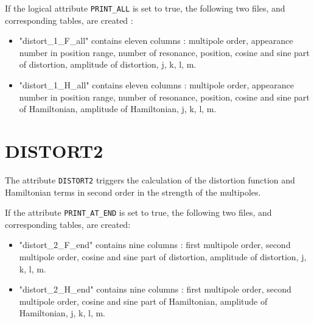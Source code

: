 If the logical attribute \texttt{PRINT\_ALL} is set to true, the
following two files, and corresponding tables, are created :   

\begin{itemize}
\item "distort\_1\_F\_all" contains eleven columns :  
multipole order, 
appearance number in position range, 
number of resonance, 
position, 
cosine and sine part of distortion, 
amplitude of distortion, 
j, k, l, m. 

\item "distort\_1\_H\_all"  contains eleven columns : 
multipole order, 
appearance number in position range, 
number of resonance, 
position, 
cosine and sine part of Hamiltonian, 
amplitude of Hamiltonian, 
j, k, l, m. 
\end{itemize}

\section{DISTORT2}
The attribute \texttt{DISTORT2} triggers the calculation of the
distortion function and Hamiltonian terms in second order in the
strength of the multipoles.  

If the attribute \texttt{PRINT\_AT\_END} is set to true, the
following two files, and corresponding tables, are created:  

\begin{itemize}
\item "distort\_2\_F\_end" contains nine columns : 
first multipole order,
second multipole order,  
cosine and sine part of distortion, 
amplitude of distortion, 
j, k, l, m. 

\item "distort\_2\_H\_end"  contains nine columns :  
first multipole order, 
second multipole order, 
cosine and sine part of Hamiltonian, 
amplitude of Hamiltonian, 
j, k, l, m.  
\end{itemize}

